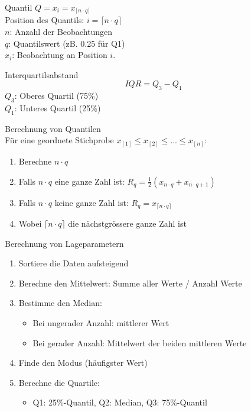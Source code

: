 \begin{minipage}{0.5\columnwidth}
\begin{corollary}{Quantil}
$
Q=x_{i}=x_{\lceil n \cdot q\rceil}
$
\vspace{2mm}\\
Position des Quantils:  $i=\lceil n \cdot q\rceil$\\
$n$: Anzahl der Beobachtungen \\
$q$: Quantilswert (zB. 0.25 für Q1) \\
$x_{i}$: Beobachtung an Position $i$.
\end{corollary}
\end{minipage}
\begin{minipage}{0.5\columnwidth}
\begin{corollary}{Interquartilsabstand}
$$
I Q R=Q_{3}-Q_{1}
$$
$Q_{3}$: Oberes Quartil (75\%) \\
$Q_{1}$: Unteres Quartil (25\%)
\end{corollary}
\end{minipage}

\begin{KR}{Berechnung von Quantilen}\\
Für eine geordnete Stichprobe $x_{[1]} \leq x_{[2]} \leq ... \leq x_{[n]}$:
\begin{enumerate}
    \setlength{\itemsep}{1pt}
    \item Berechne $n \cdot q$
    \item Falls $n \cdot q$ eine ganze Zahl ist:
        $R_q = \frac{1}{2}(x_{n\cdot q} + x_{n\cdot q+1})$
    \item Falls $n \cdot q$ keine ganze Zahl ist:
        $R_q = x_{\lceil n\cdot q \rceil}$
    \item Wobei $\lceil n\cdot q \rceil$ die nächstgrössere ganze Zahl ist
\end{enumerate}
\end{KR}

\begin{KR}{Berechnung von Lageparametern}
\begin{enumerate}
    \item Sortiere die Daten aufsteigend
    \item Berechne den Mittelwert: Summe aller Werte / Anzahl Werte
    \item Bestimme den Median:
        \begin{itemize}
            \item Bei ungerader Anzahl: mittlerer Wert
            \item Bei gerader Anzahl: Mittelwert der beiden mittleren Werte
        \end{itemize}
    \item Finde den Modus (häufigster Wert)
    \item Berechne die Quartile:
        \begin{itemize}
            \item Q1: 25\%-Quantil, Q2: Median, Q3: 75\%-Quantil
        \end{itemize}
\end{enumerate}
\end{KR}

